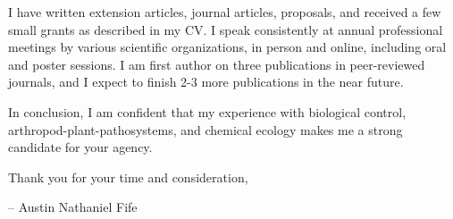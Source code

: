 \documentclass[11pt]{letter} %
\begin{document}
\begin{letter}
I have written extension articles, journal articles, proposals, and received a few small grants as described in my CV. I speak consistently at annual professional meetings by various scientific organizations, in person and online, including oral and poster sessions. I am first author on three publications in peer-reviewed journals, and I expect to finish 2-3 more publications in the near future.

In conclusion, I am confident that my experience with biological control, arthropod-plant-pathosystems, and chemical ecology makes me a strong candidate for your agency.

Thank you for your time and consideration,

\quad -- Austin Nathaniel Fife

\thispagestyle{empty}

\end{letter}
\end{document}
